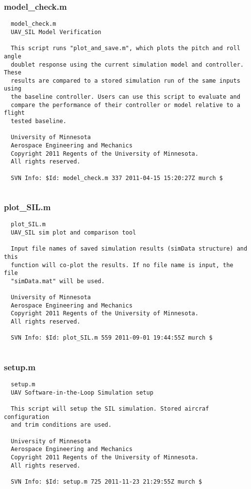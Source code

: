 \documentclass[12pt]{article}
\begin{document}
\subsubsection{model\_check.m}
\begin{verbatim}
  model_check.m
  UAV_SIL Model Verification
 
  This script runs "plot_and_save.m", which plots the pitch and roll angle
  doublet response using the current simulation model and controller. These
  results are compared to a stored simulation run of the same inputs using
  the baseline controller. Users can use this script to evaluate and
  compare the performance of their controller or model relative to a flight
  tested baseline.
 
  University of Minnesota 
  Aerospace Engineering and Mechanics 
  Copyright 2011 Regents of the University of Minnesota. 
  All rights reserved.
 
  SVN Info: $Id: model_check.m 337 2011-04-15 15:20:27Z murch $


\end{verbatim}

\subsubsection{plot\_SIL.m}
\begin{verbatim}
  plot_SIL.m
  UAV_SIL sim plot and comparison tool
 
  Input file names of saved simulation results (simData structure) and this
  function will co-plot the results. If no file name is input, the file
  "simData.mat" will be used.
 
  University of Minnesota
  Aerospace Engineering and Mechanics
  Copyright 2011 Regents of the University of Minnesota.
  All rights reserved.
 
  SVN Info: $Id: plot_SIL.m 559 2011-09-01 19:44:55Z murch $


\end{verbatim}

\subsubsection{setup.m}
\begin{verbatim}
  setup.m
  UAV Software-in-the-Loop Simulation setup
 
  This script will setup the SIL simulation. Stored aircraf configuration
  and trim conditions are used.
 
  University of Minnesota
  Aerospace Engineering and Mechanics
  Copyright 2011 Regents of the University of Minnesota.
  All rights reserved.
 
  SVN Info: $Id: setup.m 725 2011-11-23 21:29:55Z murch $


\end{verbatim}
\end{document}
